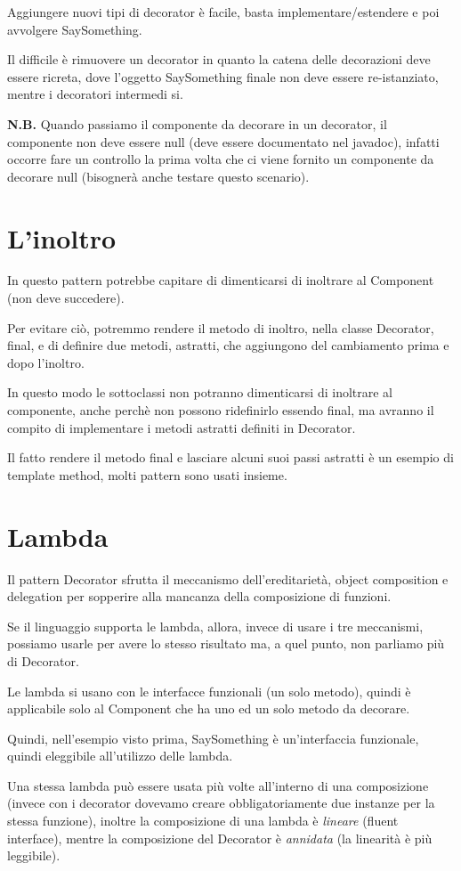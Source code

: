 Aggiungere nuovi tipi di decorator è facile, basta implementare/estendere e poi avvolgere SaySomething.

Il difficile è rimuovere un decorator in quanto la catena delle decorazioni deve essere ricreta, dove l'oggetto SaySomething finale non deve essere re-istanziato, 
mentre i decoratori intermedi si.
\medskip

\textbf{N.B.} Quando passiamo il componente da decorare in un decorator, il componente non deve essere null (deve essere documentato nel javadoc), infatti occorre 
fare un controllo la prima volta che ci viene fornito un componente da decorare null (bisognerà anche testare questo scenario).

\section{L'inoltro}

In questo pattern potrebbe capitare di dimenticarsi di inoltrare al Component (non deve succedere).

Per evitare ciò, potremmo rendere il metodo di inoltro, nella classe Decorator, final, e di definire due metodi, astratti, che aggiungono del cambiamento prima e dopo 
l'inoltro.

In questo modo le sottoclassi non potranno dimenticarsi di inoltrare al componente, anche perchè non possono ridefinirlo essendo final, ma avranno il compito di 
implementare i metodi astratti definiti in Decorator.

Il fatto rendere il metodo final e lasciare alcuni suoi passi astratti è un esempio di template method, molti pattern sono usati insieme.

\section{Lambda}

Il pattern Decorator sfrutta il meccanismo dell'ereditarietà, object composition e delegation per sopperire alla mancanza della composizione di funzioni.

Se il linguaggio supporta le lambda, allora, invece di usare i tre meccanismi, possiamo usarle per avere lo stesso risultato ma, a quel punto, non parliamo più di 
Decorator.

Le lambda si usano con le interfacce funzionali (un solo metodo), quindi è applicabile solo al Component che ha uno ed un solo metodo da decorare.

Quindi, nell'esempio visto prima, SaySomething è un'interfaccia funzionale, quindi eleggibile all'utilizzo delle lambda.

Una stessa lambda può essere usata più volte all'interno di una composizione (invece con i decorator dovevamo creare obbligatoriamente due instanze per la stessa 
funzione), inoltre la composizione di una lambda è \textit{lineare} (fluent interface), mentre la composizione del Decorator è \textit{annidata} (la linearità è 
più leggibile).